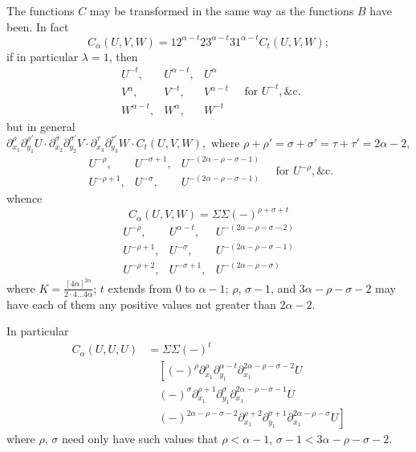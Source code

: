 \documentclass[11pt,a4paper]{book}
\begin{document}
\newpage
The functions $C$ may be transformed in the same way as the functions $B$ have been.
In fact
\[
C_{\alpha}(U, V, W) = 12^{\alpha - t} 23^{\alpha - t} 31^{\alpha - t} C_t(U, V, W);
\]
if in particular $\lambda = 1$, then
\[
\begin{array}{ccc}
U^{-t}, & U^{\alpha - t}, & U^{\alpha} \\
V^{\alpha}, & V^{-t}, & V^{\alpha - t} \\
W^{\alpha - t}, & W^{\alpha}, & W^{-t}
\end{array}
\quad \text{for } U^{-t}, \&\text{c.}
\]
but in general
\[
\partial_{x_1}^{\rho} \partial_{y_1}^{\rho'} U \cdot \partial_{x_2}^{\sigma} \partial_{y_2}^{\sigma'} V \cdot \partial_{x_3}^{\tau} \partial_{y_3}^{\tau'} W \cdot
C_t(U, V, W), \text{ where } \rho + \rho' = \sigma + \sigma' = \tau + \tau' = 2\alpha - 2,
\]
\[
\begin{array}{ccc}
U^{-\rho}, & U^{-\sigma + 1}, & U^{-(2\alpha - \rho - \sigma - 1)} \\
U^{-\rho + 1}, & U^{-\sigma}, & U^{-(2\alpha - \rho - \sigma - 1)}
\end{array}
\quad \text{for } U^{-\rho}, \&\text{c.}
\]
whence
\[
C_{\alpha}(U, V, W) = \Sigma \Sigma (-)^{\rho + \sigma + t}
\]
\[
\begin{array}{ccc}
U^{-\rho}, & U^{\alpha - t}, & U^{-(2\alpha - \rho - \sigma - 2)} \\
U^{-\rho + 1}, & U^{-\sigma}, & U^{-(2\alpha - \rho - \sigma - 1)} \\
U^{-\rho + 2}, & U^{-\sigma + 1}, & U^{-(2\alpha - \rho - \sigma)}
\end{array}
\]
where $K = \frac{[4\alpha]^{2\alpha}}{2 \cdot 4 \ldots 4\alpha}$; $t$ extends from $0$ to $\alpha - 1$; $\rho$, $\sigma - 1$, and $3\alpha - \rho - \sigma - 2$ may have
each of them any positive values not greater than $2\alpha - 2$.

In particular
\begin{align*}
C_{\alpha}(U, U, U) &= \Sigma \Sigma (-)^t \\
&\quad \left[(-)^{\rho} \partial_{x_1}^{\rho} \partial_{y_1}^{\alpha - t} \partial_{x_1}^{2\alpha - \rho - \sigma - 2} U \right. \\
&\quad \left. (-)^{\sigma} \partial_{x_1}^{\rho + 1} \partial_{y_1}^{\sigma} \partial_{x_1}^{2\alpha - \rho - \sigma - 1} U \right. \\
&\quad \left. (-)^{2\alpha - \rho - \sigma - 2} \partial_{x_1}^{\rho + 2} \partial_{y_1}^{\sigma + 1} \partial_{x_1}^{2\alpha - \rho - \sigma} U \right]
\end{align*}
where $\rho$, $\sigma$ need only have such values that $\rho < \alpha - 1$, $\sigma - 1 < 3\alpha - \rho - \sigma - 2$.
\end{document}
